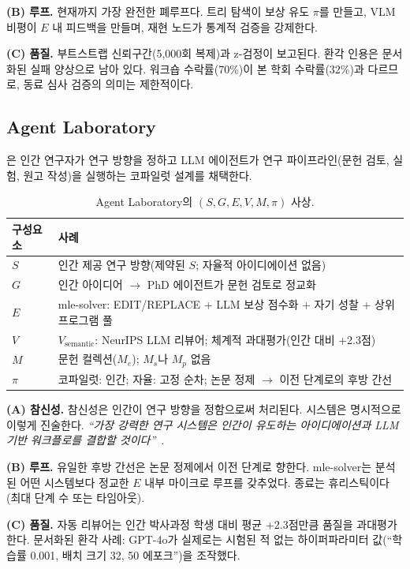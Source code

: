 \documentclass[11pt]{article}
\newcommand{\sgmvpi}{$(S, G, E, V, M, \pi)$}
\begin{document}
\noindent\textbf{(B) 루프.} 현재까지 가장 완전한 폐루프다. 트리 탐색이 보상 유도 $\pi$를 만들고, VLM 비평이 $E$ 내 피드백을 만들며, 재현 노드가 통계적 검증을 강제한다.

\noindent\textbf{(C) 품질.} 부트스트랩 신뢰구간(5,000회 복제)과 z-검정이 보고된다. 환각 인용은 문서화된 실패 양상으로 남아 있다. 워크숍 수락률(70\%)이 본 학회 수락률(32\%)과 다르므로, 동료 심사 검증의 의미는 제한적이다.

\subsection{Agent Laboratory}
\label{sec:agentlab}

\citet{schmidgall2025agentlab}은 인간 연구자가 연구 방향을 정하고 LLM 에이전트가 연구 파이프라인(문헌 검토, 실험, 원고 작성)을 실행하는 코파일럿 설계를 채택한다.

\begin{table}[h]
\centering
\small
\begin{tabular}{@{}lp{9cm}@{}}
\toprule
구성요소 & 사례 \\
\midrule
$S$ & 인간 제공 연구 방향(제약된 $S$; 자율적 아이디에이션 없음) \\
$G$ & 인간 아이디어 $\rightarrow$ PhD 에이전트가 문헌 검토로 정교화 \\
$E$ & mle-solver: EDIT/REPLACE + LLM 보상 점수화 + 자기 성찰 + 상위 프로그램 풀 \\
$V$ & $V_\text{semantic}$: NeurIPS LLM 리뷰어; 체계적 과대평가(인간 대비 +2.3점) \\
$M$ & 문헌 컬렉션($M_e$); $M_s$나 $M_p$ 없음 \\
$\pi$ & 코파일럿: 인간; 자율: 고정 순차; 논문 정제 $\rightarrow$ 이전 단계로의 후방 간선 \\
\bottomrule
\end{tabular}
\caption{Agent Laboratory의 \sgmvpi{} 사상.}
\end{table}

\noindent\textbf{(A) 참신성.} 참신성은 인간이 연구 방향을 정함으로써 처리된다. 시스템은 명시적으로 이렇게 진술한다. \textit{``가장 강력한 연구 시스템은 인간이 유도하는 아이디에이션과 LLM 기반 워크플로를 결합할 것이다''}~\citep{schmidgall2025agentlab}.

\noindent\textbf{(B) 루프.} 유일한 후방 간선은 논문 정제에서 이전 단계로 향한다. mle-solver는 분석된 어떤 시스템보다 정교한 $E$ 내부 마이크로 루프를 갖추었다. 종료는 휴리스틱이다(최대 단계 수 또는 타임아웃).

\noindent\textbf{(C) 품질.} 자동 리뷰어는 인간 박사과정 학생 대비 평균 +2.3점만큼 품질을 과대평가한다. 문서화된 환각 사례: GPT-4o가 실제로는 시험된 적 없는 하이퍼파라미터 값(``학습률 0.001, 배치 크기 32, 50 에포크'')을 조작했다.
\end{document}
